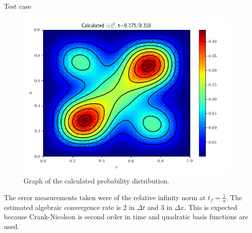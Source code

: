 \documentclass[final]{beamer}
\newlength{\onecolwid}
\newlength{\twocolwid}
\begin{document}
\begin{frame}[t]
\begin{columns}[t]
\begin{column}{\twocolwid}
\begin{columns}[t,totalwidth=\twocolwid]
\begin{column}{\onecolwid}
\begin{block}{Test case}
\begin{figure}[H]
\includegraphics[width=\linewidth]{toy_sol.png}
\caption{Graph of the calculated probability distribution.}
\end{figure}

The error measurements taken were of the relative infinity norm at $t_f=\frac{1}{\pi}$. The estimated algebraic convergence rate is $2$ in $\Delta t$ and $3$ in $\Delta x$. This is expected because Crank-Nicolson is second order in time and quadratic basis functions are used.
 

\end{block}
\end{column}
\end{columns}
\end{column}
\end{columns}
\end{frame}
\end{document}
